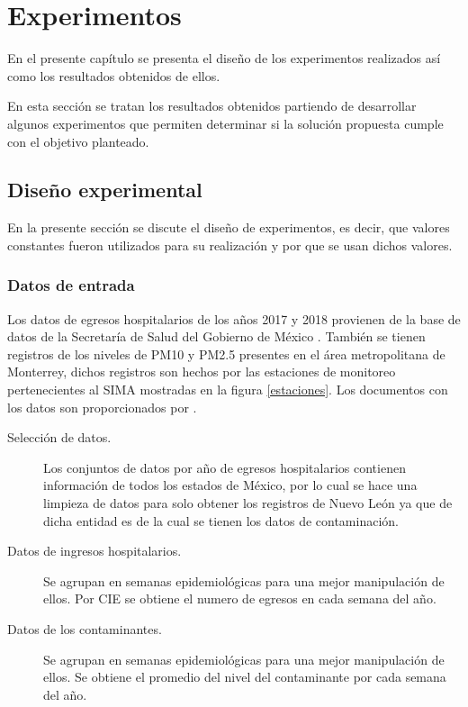 \chapter{Experimentos}

En el presente capítulo se presenta el diseño de los experimentos realizados así como los resultados obtenidos de ellos.

En esta sección se tratan los resultados obtenidos partiendo de desarrollar algunos experimentos que permiten determinar si la solución propuesta cumple con el objetivo planteado.

\section{Diseño experimental}
En la presente sección se discute el diseño de experimentos, es decir, que valores constantes fueron utilizados para su realización y por que se usan dichos valores.

\subsection{Datos de entrada}
Los datos de egresos hospitalarios de los años 2017 y 2018 provienen de la base de datos de la Secretaría de Salud del Gobierno de México \cite{f1}. También se tienen registros de los niveles de PM10 y PM2.5 presentes en el área metropolitana de Monterrey, dichos registros son hechos por las estaciones de monitoreo pertenecientes al SIMA \cite{f2} mostradas en la figura \ref{estaciones}. Los documentos con los datos son proporcionados por \citet{f3}.

\begin{description}
\item [Selección de datos.] {Los conjuntos de datos por año de egresos hospitalarios contienen información de todos los estados de México, por lo cual se hace una limpieza de datos para solo obtener los registros de Nuevo León ya que de dicha entidad es de la cual se tienen los datos de contaminación.}
\item [Datos de ingresos hospitalarios.] {Se agrupan en semanas epidemiológicas para una mejor manipulación de ellos. Por CIE \citep{r9} se obtiene el numero de egresos en cada semana del año.}
\item [Datos de los contaminantes.] {Se agrupan en semanas epidemiológicas para una mejor manipulación de ellos. Se obtiene el promedio del nivel del contaminante por cada semana del año.}
\end{description}

